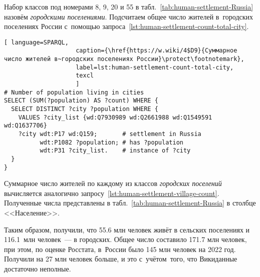 Набор классов под номерами 8, 9, 20 и 55 в табл.~\ref{tab:human-settlement-Russia} 
назовём \emph{городскими поселениями}. 
Подсчитаем общее число жителей в~городских поселениях России 
с~помощью запроса~\ref{lst:human-settlement-count-total-city}. 


\begin{lstlisting}[ language=SPARQL, 
                    caption={\href{https://w.wiki/4$D9}{Суммарное число жителей в~городских поселениях России}\protect\footnotemark},
                    label=lst:human-settlement-count-total-city,
                    texcl 
                    ]
# Number of population living in cities
SELECT (SUM(?population) AS ?count) WHERE {  
  SELECT DISTINCT ?city ?population WHERE {  
    VALUES ?city_list {wd:Q7930989 wd:Q2661988 wd:Q1549591 wd:Q1637706}
    ?city wdt:P17 wd:Q159;       # settlement in Russia
          wdt:P1082 ?population; # has ?population
          wdt:P31 ?city_list.    # instance of ?city
  }
}
\end{lstlisting}%

Суммарное число жителей по каждому из классов \emph{городских поселений} 
вычисляется аналогично запросу~\ref{lst:human-settlement-village-count}. 
Полученные числа представлены в табл.~\ref{tab:human-settlement-Russia} в столбце <<Население>>. 

Таким образом, получили, что \num{55.6} млн человек живёт в сельских поселениях и \num{116.1}~млн человек~--- в городских. 
Общее число составило \num{171.7} млн человек, 
при этом, по оценке Росстата, в~России было 145 млн человек на 2022 год. 
Получили на 27 млн человек больше, и это с~учётом~того, что Викиданные достаточно неполные. 

